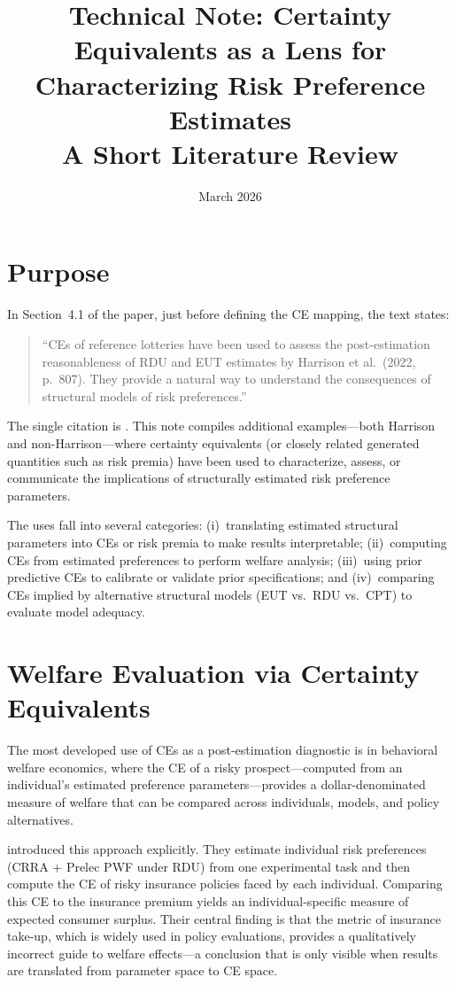 \documentclass[12pt,a4paper]{article}
\title{Technical Note: Certainty Equivalents as a Lens for\\
Characterizing Risk Preference Estimates\\[6pt]
\large A Short Literature Review}
\author{}
\date{March 2026}
\begin{document}
\maketitle
\thispagestyle{empty}

\section{Purpose}

In Section~4.1 of the paper, just before defining the CE mapping, the text
states:

\begin{quote}
``CEs of reference lotteries have been used to assess the post-estimation
reasonableness of RDU and EUT estimates by Harrison et al.\ (2022, p.\
807). They provide a natural way to understand the consequences of
structural models of risk preferences.''
\end{quote}

The single citation is \textcite{Harrison2022}. This note compiles additional
examples---both Harrison and non-Harrison---where certainty equivalents (or
closely related generated quantities such as risk premia) have been used to
characterize, assess, or communicate the implications of structurally estimated
risk preference parameters.

The uses fall into several categories: (i)~translating estimated structural
parameters into CEs or risk premia to make results interpretable;
(ii)~computing CEs from estimated preferences to perform welfare analysis;
(iii)~using prior predictive CEs to calibrate or validate prior
specifications; and (iv)~comparing CEs implied by alternative structural
models (EUT vs.\ RDU vs.\ CPT) to evaluate model adequacy.

\section{Welfare Evaluation via Certainty Equivalents}

The most developed use of CEs as a post-estimation diagnostic is in behavioral
welfare economics, where the CE of a risky prospect---computed from an
individual's estimated preference parameters---provides a dollar-denominated
measure of welfare that can be compared across individuals, models, and policy
alternatives.

\textcite{Harrison2016} introduced this approach explicitly. They estimate
individual risk preferences (CRRA + Prelec PWF under RDU) from one
experimental task and then compute the CE of risky insurance policies faced by
each individual. Comparing this CE to the insurance premium yields an
individual-specific measure of expected consumer surplus. Their central finding
is that the metric of insurance take-up, which is widely used in policy
evaluations, provides a qualitatively incorrect guide to welfare effects---a
conclusion that is only visible when results are translated from parameter
space to CE space.
\end{document}
